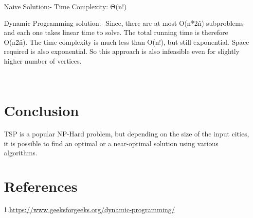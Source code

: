 \documentclass[conference]{IEEEtran}
\begin{document}
Naive Solution:-
Time Complexity: Θ(n!)

Dynamic Programming solution:-
Since, there are at most O(n*2\^{n}) subproblems and each one takes linear time to solve. The total running time is therefore O(n\^2\^n). The time complexity is much less than O(n!), but still exponential. Space required is also exponential. So this approach is also infeasible even for slightly higher number of vertices.

\\


\section{Conclusion}
TSP is a popular NP-Hard problem, but depending on the size of the input cities, it is possible to find an optimal or a near-optimal solution using various algorithms.
 
\section{References}
\color{blue}1.{\url{https://www.geeksforgeeks.org/dynamic-programming/} }\\
\end{document}
